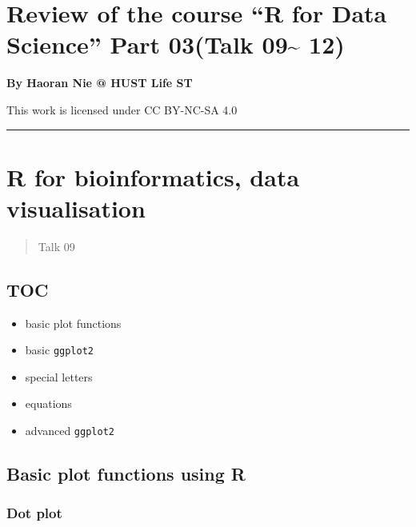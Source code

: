 \documentclass[
]{article}
\author{}
\date{}
\begin{document}
\hypertarget{review-of-the-course-r-for-data-science-part-03talk-09-12}{%
\section{Review of the course ``R for Data Science'' Part 03(Talk
09\textasciitilde{}
12)}\label{review-of-the-course-r-for-data-science-part-03talk-09-12}}

\textbf{By Haoran Nie @ HUST Life ST}

This work is licensed under CC BY-NC-SA 4.0

\begin{center}\rule{0.5\linewidth}{0.5pt}\end{center}

\tableofcontents

\newpage
{}
\hypertarget{r-for-bioinformatics-data-visualisation}{%
\section{R for bioinformatics, data
visualisation}\label{r-for-bioinformatics-data-visualisation}}

\begin{quote}
Talk 09
\end{quote}

\hypertarget{toc}{%
\subsection{TOC}\label{toc}}

\begin{itemize}
\item
  basic plot functions
\item
  basic \texttt{ggplot2}
\item
  special letters
\item
  equations
\item
  advanced \texttt{ggplot2}
\end{itemize}

\hypertarget{basic-plot-functions-using-r}{%
\subsection{Basic plot functions using
R}\label{basic-plot-functions-using-r}}

\hypertarget{dot-plot}{%
\subsubsection{Dot plot}\label{dot-plot}}
\end{document}
